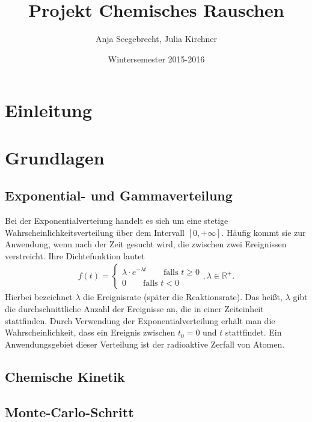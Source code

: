 \documentclass{scrartcl}
\title{Projekt Chemisches Rauschen}
\author{Anja Seegebrecht, Julia Kirchner}
\date{Wintersemester 2015-2016}
\begin{document}
\maketitle

\newpage

\tableofcontents

\newpage

\section{Einleitung}


\section{Grundlagen}
\subsection{Exponential- und Gammaverteilung}
Bei der Exponentialverteiung handelt es sich um eine stetige Wahrscheinlichkeitsverteilung über dem Intervall $[0, +\infty]$. Häufig kommt sie zur Anwendung, wenn nach der Zeit gesucht wird, die zwischen zwei Ereignissen verstreicht.
Ihre Dichtefunktion lautet
\begin{align*}
    f(t) = \begin{cases} \lambda \cdot e^{-\lambda t} \qquad \text{falls } t \geq 0 \\ 0 \qquad \text{falls } t < 0 \end{cases}, \lambda \in \mathbb{R}^+.
\end{align*}
Hierbei bezeichnet $\lambda$ die Ereignisrate (später die Reaktionsrate). Das heißt, $\lambda$ gibt die durchschnittliche Anzahl der Ereignisse an, die in einer Zeiteinheit stattfinden. Durch Verwendung der Exponentialverteilung erhält man die Wahrscheinlichkeit, dass ein Ereignis zwischen $t_0=0$ und $t$ stattfindet. Ein Anwendungsgebiet dieser Verteilung ist der radioaktive Zerfall von Atomen. %
\subsection{Chemische Kinetik}
\subsection{Monte-Carlo-Schritt}
\end{document}
